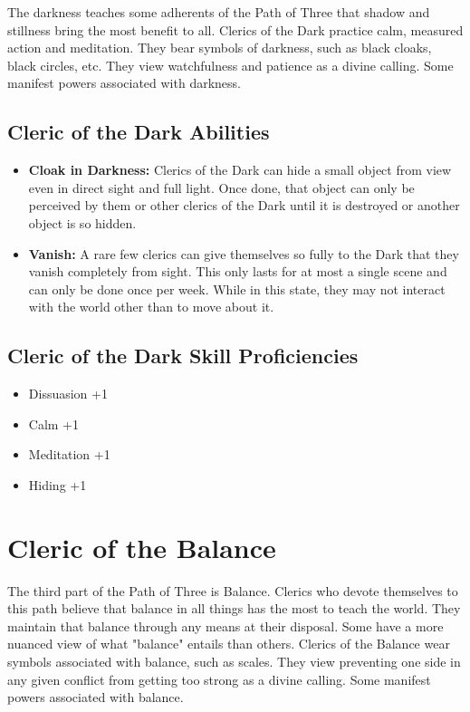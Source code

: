 \begin{multicols}{2}
The darkness teaches some adherents of the Path of Three that shadow and stillness
bring the most benefit to all. Clerics of the Dark practice calm, measured
action and meditation. They bear symbols of darkness, such as black cloaks,
black circles, etc. They view watchfulness and patience as a divine calling.
Some manifest powers associated with darkness.

\subsection{Cleric of the Dark Abilities}

\begin{itemize}
  \item \textbf{Cloak in Darkness:} Clerics of the Dark can hide a small object
    from view even in direct sight and full light. Once done, that object can only
    be perceived by them or other clerics of the Dark until it is destroyed or
    another object is so hidden.
  \item \textbf{Vanish:} A rare few clerics can give themselves so fully to the
    Dark that they vanish completely from sight. This only lasts for at most a single
    scene and can only be done once per week. While in this state, they may not
    interact with the world other than to move about it.
\end{itemize}

\subsection{Cleric of the Dark Skill Proficiencies}

\begin{itemize}
  \item Dissuasion +1
  \item Calm +1
  \item Meditation +1
  \item Hiding +1
\end{itemize}

\section{Cleric of the Balance}

The third part of the Path of Three is Balance. Clerics who devote themselves to
this path believe that balance in all things has the most to teach the world.
They maintain that balance through any means at their disposal. Some have a more
nuanced view of what "balance" entails than others. Clerics of the Balance wear
symbols associated with balance, such as scales. They view preventing one side
in any given conflict from getting too strong as a divine calling. Some manifest
powers associated with balance.


\end{multicols}
